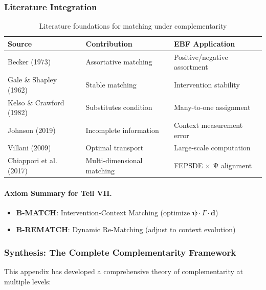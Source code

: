 \subsubsection{Literature Integration}

\begin{table}[h]
\centering
\small
\begin{tabular}{p{3.5cm}p{4cm}p{5cm}}
\toprule
\textbf{Source} & \textbf{Contribution} & \textbf{EBF Application} \\
\midrule
Becker (1973) & Assortative matching & Positive/negative assortment \\
Gale \& Shapley (1962) & Stable matching & Intervention stability \\
Kelso \& Crawford (1982) & Substitutes condition & Many-to-one assignment \\
Johnson (2019) & Incomplete information & Context measurement error \\
Villani (2009) & Optimal transport & Large-scale computation \\
Chiappori et al. (2017) & Multi-dimensional matching & FEPSDE × Ψ alignment \\
\bottomrule
\end{tabular}
\caption{Literature foundations for matching under complementarity}
\label{tab:matching-lit}
\end{table}

\paragraph{Axiom Summary for Teil VII.}

\begin{itemize}
    \item \textbf{B-MATCH}: Intervention-Context Matching (optimize $\boldsymbol{\psi} \cdot \Gamma \cdot \mathbf{d}$)
    \item \textbf{B-REMATCH}: Dynamic Re-Matching (adjust to context evolution)
\end{itemize}

\subsubsection{Synthesis: The Complete Complementarity Framework}

This appendix has developed a comprehensive theory of complementarity at multiple 
levels:

